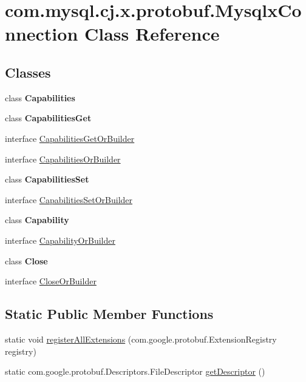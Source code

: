 \hypertarget{classcom_1_1mysql_1_1cj_1_1x_1_1protobuf_1_1_mysqlx_connection}{}\section{com.\+mysql.\+cj.\+x.\+protobuf.\+Mysqlx\+Connection Class Reference}
\label{classcom_1_1mysql_1_1cj_1_1x_1_1protobuf_1_1_mysqlx_connection}
\subsection*{Classes}
\begin{DoxyCompactItemize}
\item 
class {\bfseries Capabilities}
\item 
class {\bfseries Capabilities\+Get}
\item 
interface \mbox{\hyperlink{interfacecom_1_1mysql_1_1cj_1_1x_1_1protobuf_1_1_mysqlx_connection_1_1_capabilities_get_or_builder}{Capabilities\+Get\+Or\+Builder}}
\item 
interface \mbox{\hyperlink{interfacecom_1_1mysql_1_1cj_1_1x_1_1protobuf_1_1_mysqlx_connection_1_1_capabilities_or_builder}{Capabilities\+Or\+Builder}}
\item 
class {\bfseries Capabilities\+Set}
\item 
interface \mbox{\hyperlink{interfacecom_1_1mysql_1_1cj_1_1x_1_1protobuf_1_1_mysqlx_connection_1_1_capabilities_set_or_builder}{Capabilities\+Set\+Or\+Builder}}
\item 
class {\bfseries Capability}
\item 
interface \mbox{\hyperlink{interfacecom_1_1mysql_1_1cj_1_1x_1_1protobuf_1_1_mysqlx_connection_1_1_capability_or_builder}{Capability\+Or\+Builder}}
\item 
class {\bfseries Close}
\item 
interface \mbox{\hyperlink{interfacecom_1_1mysql_1_1cj_1_1x_1_1protobuf_1_1_mysqlx_connection_1_1_close_or_builder}{Close\+Or\+Builder}}
\end{DoxyCompactItemize}
\subsection*{Static Public Member Functions}
\begin{DoxyCompactItemize}
\item 
static void \mbox{\hyperlink{classcom_1_1mysql_1_1cj_1_1x_1_1protobuf_1_1_mysqlx_connection_a51f7a824fdb8a7d42f33dc31ef519a94}{register\+All\+Extensions}} (com.\+google.\+protobuf.\+Extension\+Registry registry)
\item 
static com.\+google.\+protobuf.\+Descriptors.\+File\+Descriptor \mbox{\hyperlink{classcom_1_1mysql_1_1cj_1_1x_1_1protobuf_1_1_mysqlx_connection_af44fd15a800014c0f9290ee45f5fc6ce}{get\+Descriptor}} ()
\end{DoxyCompactItemize}


